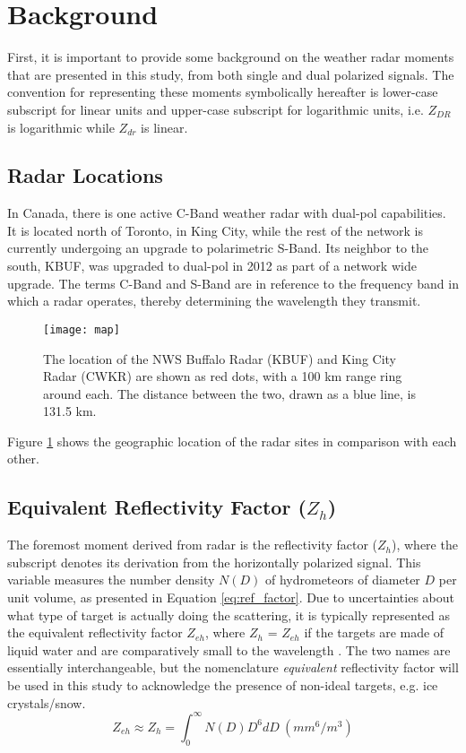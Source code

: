 \section{Background}
First, it is important to provide some background on the weather radar moments that are presented in this study, from both single and dual polarized signals.
The convention for representing these moments symbolically hereafter is lower-case subscript for linear units and upper-case subscript for logarithmic units,
i.e. $Z_{DR}$ is logarithmic while $Z_{dr}$ is linear.
\subsection{Radar Locations}
In Canada, there is one active C-Band weather radar with dual-pol capabilities. It is located north of Toronto, in King City, while the rest of the network
is
currently undergoing an upgrade to polarimetric S-Band. Its neighbor to the south, KBUF, was upgraded to dual-pol in 2012 as part of a network wide upgrade.
The terms C-Band and S-Band are in reference to the frequency band in which a radar operates, thereby determining the wavelength they transmit. 
\begin{figure}[h]
\texttt{[image: map]}
\caption{The location of the NWS Buffalo Radar (KBUF) and King City Radar (CWKR) are shown as red dots, with a 100 km range ring around each. The distance
between the two, drawn as a blue line, is 131.5 km.} 
\label{map}
\end{figure}
Figure \ref{map} shows the geographic location of the radar sites in comparison with each other.
\subsection{Equivalent Reflectivity Factor ($Z_{h}$)}
The foremost moment derived from radar is the reflectivity factor ($Z_{h}$), where the
subscript denotes its derivation from the horizontally polarized signal. This variable
measures the number density $N(D)$ of hydrometeors of diameter $D$ per unit volume, as
presented in Equation \ref{eq:ref_factor}. Due to uncertainties about what type of
target is actually doing the scattering, it is typically represented as the equivalent
reflectivity factor $Z_{eh}$, where $Z_{h}$ = $Z_{eh}$ if the targets are made of liquid 
water and are comparatively small to the wavelength \citep{Fabry2015}. The two names are 
essentially interchangeable, but the nomenclature \textit{equivalent} reflectivity factor will be used in this
study to acknowledge the presence of non-ideal targets, e.g. ice crystals/snow.
\begin{equation}\label{eq:ref_factor}
Z_{eh} \approx Z_{h} = \int_0^{\infty} N(D)D^6dD \ (mm^6/m^3)
\end{equation}
